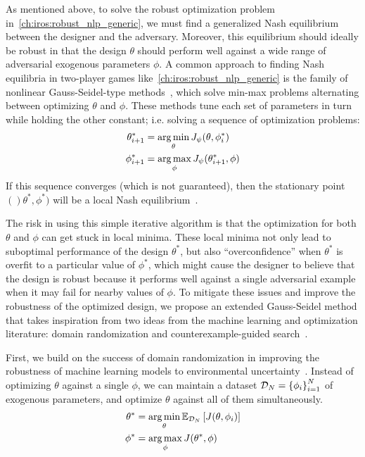 As mentioned above, to solve the robust optimization problem in~\eqref{ch:iros:robust_nlp_generic}, we must find a generalized Nash equilibrium between the designer and the adversary. Moreover, this equilibrium should ideally be robust in that the design $\theta$ should perform well against a wide range of adversarial exogenous parameters $\phi$.
%
A common approach to finding Nash equilibria in two-player games like~\eqref{ch:iros:robust_nlp_generic} is the family of nonlinear Gauss-Seidel-type methods~\cite{facchineiGeneralizedNashEquilibrium2007}, which solve min-max problems alternating between optimizing $\theta$ and $\phi$. These methods tune each set of parameters in turn while holding the other constant; i.e. solving a sequence of optimization problems:
\begin{subequations}
    \begin{align}\label{ch:iros:eq:gauss_seidel}
        \theta^*_{i+1} & = \operatorname*{arg\,min}_\theta J_\psi(\theta, \phi^*_i)   \\
        \phi^*_{i+1}   & = \operatorname*{arg\,max}_\phi J_\psi(\theta^*_{i+1}, \phi)
    \end{align}
\end{subequations}
%
If this sequence converges (which is not guaranteed), then the stationary point $()\theta^*, \phi^*)$ will be a local Nash equilibrium~\cite{facchineiGeneralizedNashEquilibrium2007}.

The risk in using this simple iterative algorithm is that the optimization for both $\theta$ and $\phi$ can get stuck in local minima. These local minima not only lead to suboptimal performance of the design $\theta^*$, but also ``overconfidence'' when $\theta^*$ is overfit to a particular value of $\phi^*$, which might cause the designer to believe that the design is robust because it performs well against a single adversarial example when it may fail for nearby values of $\phi$.
%
To mitigate these issues and improve the robustness of the optimized design, we propose an extended Gauss-Seidel method that takes inspiration from two ideas from the machine learning and optimization literature: domain randomization and counterexample-guided search~\cite{tobinDomainRandomizationTransferring2017,changNeuralLyapunovControl2019}.

First, we build on the success of domain randomization in improving the robustness of machine learning models to environmental uncertainty~\cite{tobinDomainRandomizationTransferring2017}. Instead of optimizing $\theta$ against a single $\phi$, we can maintain a dataset $\mathcal{D}_N = \left\{\phi_i\right\}_{i=1}^N$ of exogenous parameters, and optimize $\theta$ against all of them simultaneously.
\begin{subequations}
    \begin{align}\label{ch:iros:eq:gauss_seidel_domain_randomization}
        \theta^* & = \operatorname*{arg\,min}_\theta \mathbb{E}_{\mathcal{D}_N} \left[ J(\theta, \phi_i) \right] \\
        \phi^*   & = \operatorname*{arg\,max}_\phi J(\theta^*, \phi)
    \end{align}
\end{subequations}

